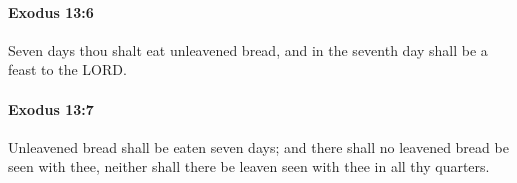 		\paragraph{Exodus 13:6} %
			\label{EXODUS-13-6}

			Seven days thou shalt eat unleavened bread, and in the seventh day shall be a feast to the LORD.


		\paragraph{Exodus 13:7} %
			\label{EXODUS-13-7}

			Unleavened bread shall be eaten seven days; and there shall no leavened bread be seen with thee, neither shall there be leaven seen with thee in all thy quarters.


